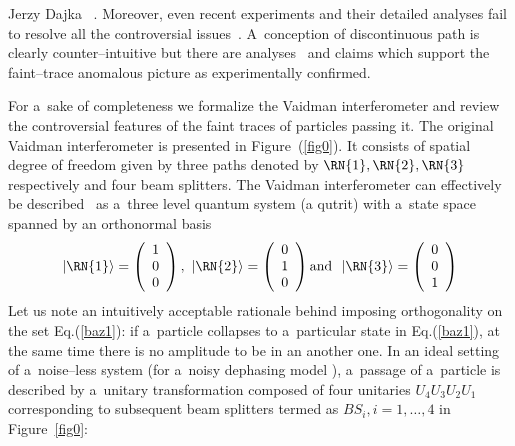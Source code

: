 \begin{artengenv}{Jerzy Dajka}
~\parencite{PhysRevA.91.012103,PhysRevA.93.036103,PhysRevA.92.023829,PhysRevA.93.017801, Hashmi_2016,Vaidman_2018,Hashmi_2018,elitzur}. Moreover, even recent experiments and their detailed analyses fail to resolve all the controversial issues~\parencite{PhysRevLett.111.240402,10.3389/fphy.2015.00047,10.3389/fphy.2015.00048,Sponar_2019,PhysRevA.95.042121,PhysRevA.97.052111, PhysRevA.97.052111,PhysRevA.89.033825,elitzur,WIESNIAK20182565}.  
A~conception of
discontinuous path is clearly counter--intuitive but there are analyses~\parencite{e20110854,PhysRevA.101.052119} and claims which support the faint--trace anomalous picture as experimentally confirmed.  


For a~sake of completeness we formalize the Vaidman interferometer and review the controversial features of the faint traces of particles passing it. The original Vaidman interferometer is presented in Figure~(\ref{fig0}). It consists of spatial degree of freedom given by three paths denoted by $\RN{1},\RN{2},\RN{3}$ respectively and four beam splitters. The Vaidman interferometer can effectively be described~\parencite{PhysRevA.96.022126,PhysRevA.99.026103,PhysRevA.99.026104,scirep} as a~three level quantum system (a qutrit) with a~state space spanned by an orthonormal basis
%
\begin{equation}\label{baz1}
|\RN{1}\rangle=\left(\begin{array}{c} 1 \\ 0 \\ 0   
\end{array}\right),\,\,|\RN{2}\rangle=\left(\begin{array}{c} 0 \\ 1 \\ 0   
\end{array}\right)  \mbox{and}\,\,\,\, |\RN{3}\rangle=\left(\begin{array}{c} 0 \\ 0 \\ 1   
\end{array}\right)
\end{equation}
%
Let us note an intuitively acceptable rationale behind imposing orthogonality on the set Eq.(\ref{baz1}): if a~particle collapses to a~particular state in Eq.(\ref{baz1}), at the same time there is no amplitude to be in an another one.  
%
In an ideal setting of a~noise--less system (for a~noisy dephasing model \parencite[cf.][]{scirep}), a~passage of a~particle is described by a~unitary transformation composed of four unitaries $U_4U_3U_2U_1$ corresponding to subsequent beam splitters termed as $BS_{i}, i=1, \ldots, 4$ in Figure~\ref{fig0}:

\end{artengenv}
